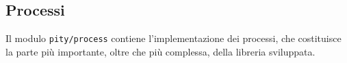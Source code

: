 \subsection{Processi}

Il modulo \lstinline{pity/process} contiene l'implementazione dei
processi, che costituisce la parte pi\`u importante, oltre che pi\`u
complessa, della libreria sviluppata.




